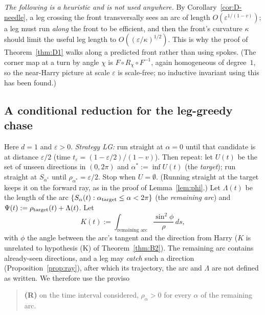 \begin{remark}[Heuristic]\label{rem:D-curv}
\emph{The following is a heuristic and is not used anywhere.} By Corollary~\ref{cor:D-needle}, a leg crossing the front
transversally sees an arc of length $O(\varepsilon^{1/(1-v)})$; a leg must run \emph{along} the front to be efficient, and then
the front's curvature $\kappa$ should limit the useful leg length to $O((\varepsilon/\kappa)^{1/2})$. This is why the proof of
Theorem~\ref{thm:D1} walks along a predicted front rather than using spokes. (The corner map at a turn by angle $\chi$ is
$F\circ R_\chi\circ F^{-1}$, again homogeneous of degree~$1$, so the near-Harry picture at scale $\varepsilon$ is scale-free; no
inductive invariant using this has been found.)
\end{remark}

\subsection{A conditional reduction for the leg-greedy chase}
Here $d=1$ and $\varepsilon>0$. \emph{Strategy LG:} run straight at $\alpha=0$ until that candidate is at distance
$\varepsilon/2$ (time $t_\varepsilon=(1-\varepsilon/2)/(1-v)$). Then repeat: let $U(t)$ be the set of unseen directions in
$(0,2\pi)$ and $\alpha^*:=\inf U(t)$ (the \emph{target}); run straight at $S_{\alpha^*}$ until $\rho_{\alpha^*}=\varepsilon/2$.
Stop when $U=\emptyset$. (Running straight at the target keeps it on the forward ray, as in the proof of Lemma~\ref{lem:phi}.)
Let $\Lambda(t)$ be the length of the arc $\{S_\alpha(t):\alpha_{\rm target}\le\alpha<2\pi\}$ (the \emph{remaining arc}) and
$\Psi(t):=\rho_{\rm target}(t)+\Lambda(t)$. Let
\[
K(t):=\int_{\text{remaining arc}}\frac{\sin^2\phi}{\rho}\,ds,
\]
with $\phi$ the angle between the arc's tangent and the direction from Harry ($K$ is unrelated to hypothesis (K) of
Theorem~\ref{thm:B2}). The remaining arc contains already-seen directions, and a leg may \emph{catch} such a direction
(Proposition~\ref{prop:ray}), after which its trajectory, the arc and $\Lambda$ are not defined as written. We therefore use the
proviso
\begin{quote}
\textbf{(R)} on the time interval considered, $\rho_\alpha>0$ for every $\alpha$ of the remaining arc.
\end{quote}

